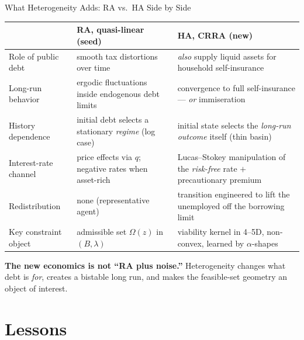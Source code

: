 \documentclass[10pt,aspectratio=169]{beamer}
\newcommand{\compacttables}{\renewcommand{\arraystretch}{1.15}}
\begin{document}
\begin{frame}{What Heterogeneity Adds: RA vs.\ HA Side by Side}
\compacttables
\begin{center}\footnotesize
\renewcommand{\arraystretch}{1.0}
\begin{tabular}{p{3.0cm}p{4.4cm}p{4.7cm}}
\toprule
& \textbf{RA, quasi-linear (seed)} & \textbf{HA, CRRA (new)} \\
\midrule
Role of public debt & smooth tax distortions over time & \emph{also} supply liquid assets for household self-insurance \\
Long-run behavior & ergodic fluctuations inside endogenous debt limits & convergence to full self-insurance --- \emph{or} immiseration \\
History dependence & initial debt selects a stationary \emph{regime} (log case) & initial state selects the \emph{long-run outcome} itself (thin basin) \\
Interest-rate channel & price effects via $q$; negative rates when asset-rich & Lucas--Stokey manipulation of the \emph{risk-free} rate $+$ precautionary premium \\
Redistribution & none (representative agent) & transition engineered to lift the unemployed off the borrowing limit \\
Key constraint object & admissible set $\Omega(z)$ in $(B,\lambda)$ & viability kernel in 4--5D, non-convex, learned by $\alpha$-shapes \\
\bottomrule
\end{tabular}
\end{center}

\smallskip
\begin{block}{}
\small \textbf{The new economics is not ``RA plus noise.''} Heterogeneity changes what debt is \emph{for},
creates a bistable long run, and makes the feasible-set geometry an object of interest.
\end{block}
\end{frame}

\section{Lessons}
\end{document}
